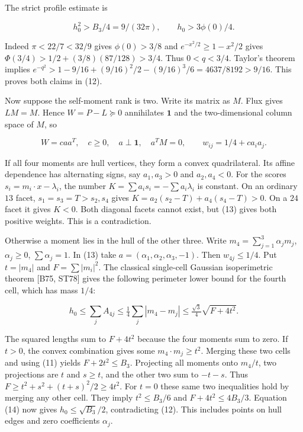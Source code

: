 \documentclass[
  11pt,
]{article}
\begin{document}
The strict profile estimate is

\[
 h_0^2>B_3/4=9/(32\pi),\qquad h_0>3\phi(0)/4.         \tag{12}
\]

Indeed \(\pi<22/7<32/9\) gives \(\phi(0)>3/8\) and
\(e^{-x^2/2}\ge1-x^2/2\) gives \(\Phi(3/4)>1/2+(3/8)(87/128)>3/4\). Thus
\(0<q<3/4\). Taylor's theorem implies
\(e^{-q^2}>1-9/16+(9/16)^2/2-(9/16)^3/6
=4637/8192>9/16\). This proves both claims in (12).

Now suppose the self-moment rank is two. Write its matrix as \(M\). Flux
gives \(LM=M\). Hence \(W=P-L\succeq0\) annihilates \(\mathbf1\) and the
two-dimensional column space of \(M\), so

\[
 W=caa^T,\quad c\ge0,\quad a\perp\mathbf1,\quad a^TM=0,
 \qquad w_{ij}=1/4+ca_i a_j.                            \tag{13}
\]

If all four moments are hull vertices, they form a convex quadrilateral.
Its affine dependence has alternating signs, say \(a_1,a_3>0\) and
\(a_2,a_4<0\). For the scores \(s_i=m_i\cdot x-\lambda_i\), the number
\(K=\sum a_i s_i=-\sum a_i\lambda_i\) is constant. On an ordinary \(13\)
facet, \(s_1=s_3=T>s_2,s_4\) gives \(K=a_2(s_2-T)+a_4(s_4-T)>0\). On a
\(24\) facet it gives \(K<0\). Both diagonal facets cannot exist, but
(13) gives both positive weights. This is a contradiction.

Otherwise a moment lies in the hull of the other three. Write
\(m_4=\sum_{j=1}^3\alpha_jm_j\), \(\alpha_j\ge0\), \(\sum\alpha_j=1\).
In (13) take \(a=(\alpha_1,\alpha_2,\alpha_3,-1)\). Then
\(w_{4j}\le1/4\). Put \(t=|m_4|\) and \(F=\sum|m_i|^2\). The classical
single-cell Gaussian isoperimetric theorem {[}B75, ST78{]} gives the
following perimeter lower bound for the fourth cell, which has mass
\(1/4\):

\[
 h_0\le\sum_j A_{4j}\le\tfrac14\sum_j|m_4-m_j|
             \le\tfrac{\sqrt3}{4}\sqrt{F+4t^2}.        \tag{14}
\]

The squared lengths sum to \(F+4t^2\) because the four moments sum to
zero. If \(t>0\), the convex combination gives some
\(m_4\cdot m_j\ge t^2\). Merging these two cells and using (11) yields
\(F+2t^2\le B_3\). Projecting all moments onto \(m_4/t\), two
projections are \(t\) and \(s\ge t\), and the other two sum to \(-t-s\).
Thus \(F\ge t^2+s^2+(t+s)^2/2\ge4t^2\). For \(t=0\) these same two
inequalities hold by merging any other cell. They imply \(t^2\le B_3/6\)
and \(F+4t^2\le4B_3/3\). Equation (14) now gives \(h_0\le\sqrt{B_3}/2\),
contradicting (12). This includes points on hull edges and zero
coefficients \(\alpha_j\).
\end{document}
